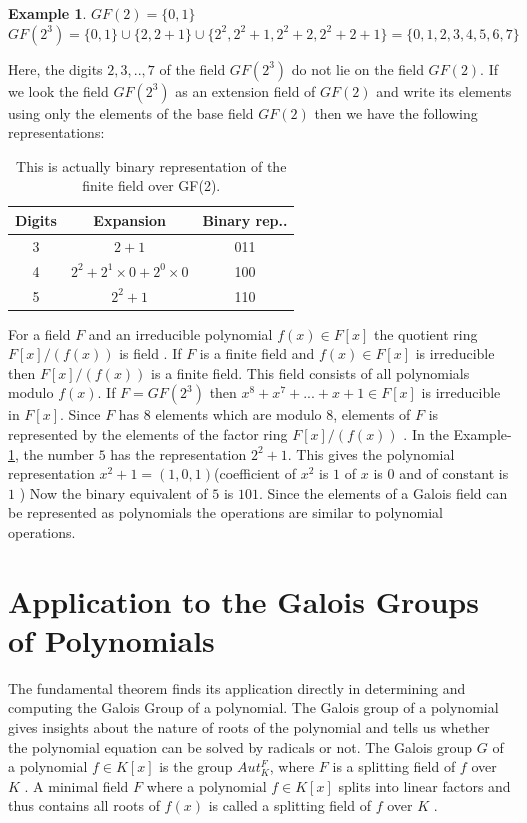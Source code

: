 \documentclass[a4paper,twoside,10pt]{article}
\theoremstyle{plain}
\theoremstyle{definition}
\newtheorem{example}[theorem]{Example}
\begin{document}
\begin{example}
    \(GF(2)=\{0,1\}\)\\
    \(GF(2^3)=\{0,1\} \cup \{2,2+1\} \cup \{2^2,2^2+1,2^2+2,2^2+2+1\}=\{0,1,2,3,4,5,6,7\}\)
    \label{ex1}
\end{example}

Here, the digits \(2,3,..,7\) of the field \(GF(2^3)\) do not lie on the field \(GF(2)\). If we look the field \(GF(2^3)\) as an extension field of \(GF(2)\) and write its elements using only the elements of the base field \(GF(2)\) then we have the following representations:
\begin{table}[h!]
  \centering
\begin{tabular}{|c|c|c|}
    \hline
    Digits & Expansion & Binary rep..\\
    \hline
    3 & \(2+1\) & 011 \\
    4 & \(2^2+2^1 \times 0 +2^0 \times 0\) & 100 \\
    5 & \(2^2+1\) & 110 \\
    \hline
\end{tabular}
\caption{\small This is actually binary representation of the finite field over GF(2).}
\end{table}

\noindent
For a field \(F\) and an irreducible polynomial \(f(x) \in F[x]\) the quotient ring \(F[x]/(f(x))\) is field \cite{galois}. If \(F\) is a finite field and \(f(x) \in F[x]\) is irreducible then \(F[x]/(f(x))\) is a finite field. This field consists of all polynomials modulo \(f(x)\). If \(F=GF(2^3)\) then \(x^8+x^7+...+x+1 \in F[x]\) is irreducible in \(F[x]\). Since \(F\) has \(8\) elements which are modulo \(8\), elements of \(F\) is represented by the elements of the factor ring \(F[x]/(f(x))\) \cite{aes}. In the Example-\ref{ex1}, the number \(5\) has the representation \(2^2+1\). This gives the polynomial representation \(x^2+1=(1,0,1)\)(coefficient of \(x^2\) is \(1\) of \(x\) is \(0\) and of constant is \(1\) ) Now the binary equivalent of \(5\) is \(101\). Since the elements of a Galois field can be represented as polynomials the operations are similar to polynomial operations.


\section{Application to the Galois Groups of Polynomials}
The fundamental theorem finds its application directly in determining and computing the Galois Group of a polynomial. The Galois group of a polynomial gives insights about the nature of roots of the polynomial and tells us whether the polynomial equation can be solved by radicals or not. The Galois group \(G\) of a polynomial \(f \in K[x]\) is the group \(Aut_K^F\), where \(F\) is a splitting field of \(f\) over \(K\) \cite{hunger}. A minimal field \(F\) where a polynomial \(f \in K[x]\) splits into linear factors and thus contains all roots of \(f(x)\) is called a splitting field of \(f\) over \(K\) \cite{hunger}.\\
\end{document}

